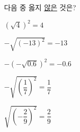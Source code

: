 다음 중 옳지 \underline{않은} 것은?
\begin{choicesii}{\rule[-3ex]{0pt}{8ex}$(\sqrt{4})^2=4$}{\rule[-3ex]{0pt}{8ex}$-\sqrt{(-13)^2}=-13$}{\rule[-3ex]{0pt}{8ex}$-(-\sqrt{0.6})^2=-0.6$}{\rule[-3ex]{0pt}{8ex}$-\sqrt{\left(\dfrac{1}{7}\right)^2}=\dfrac{1}{7}$}{\rule[-3ex]{0pt}{8ex}$\sqrt{\left(-\dfrac{2}{9}\right)^2}=\dfrac{2}{9}$}\end{choicesii}
